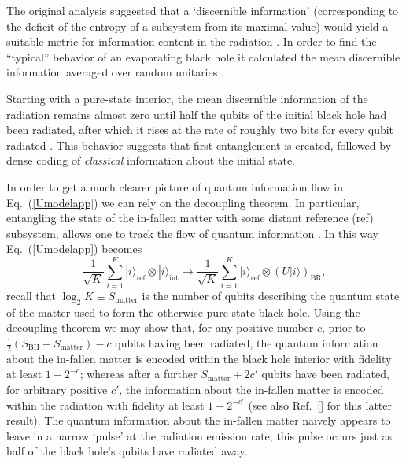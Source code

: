 \documentclass[twocolumn,aps,showpacs,prl]{revtex4}
\begin{document}
The original analysis suggested that a `discernible information'
(corresponding to the deficit of the entropy of a subsystem from
its maximal value) would yield a suitable metric for information
content in the radiation \cite{Page93app}. In order to find the
``typical'' behavior of an evaporating black hole it calculated
the mean discernible information averaged over random
unitaries \cite{Page93app}.

Starting with a pure-state interior, the mean discernible information
of the radiation remains almost zero until half the qubits of the
initial black hole had been radiated, after which it rises at
the rate of roughly two bits for every qubit radiated \cite{Page93app}.
This behavior suggests that first entanglement is created, followed by
dense coding \cite{Bennett92app} of {\it classical\/} information about the
initial state.

In order to get a much clearer picture of quantum information flow
in Eq.~(\ref{Umodelapp}) we can rely on the decoupling theorem.
In particular, entangling the state of the in-fallen matter with some
distant reference (ref) subsystem, allows one to track the flow of
quantum information \cite{meapp,Hayden07app}. In this way Eq.~(\ref{Umodelapp})
becomes
\begin{equation}
\frac{1}{\sqrt{K}}\sum_{i=1}^{K}
|i\rangle_{\text{ref}}\otimes|i\rangle_{\text{int}}\rightarrow
\frac{1}{\sqrt{K}}\sum_{i=1}^{K}
|i\rangle_{\text{ref}}\otimes(U|i\rangle)_{\text{BR}},
\label{HaydenPreskill}
\end{equation}
recall that $\log_2 K\equiv S_{\text{matter}}$ is the number of qubits
describing the quantum state of the matter used to form the otherwise
pure-state black hole. Using the decoupling theorem \cite{Abey06app}
we may show that, for any positive number $c$, prior to
$\frac{1}{2}(S_{\text{BH}}-S_{\text{matter}})-c$ qubits having been
radiated, the quantum information about the in-fallen matter
is encoded within the black hole interior with fidelity at least
$1-2^{-c}$; whereas after a further $S_{\text{matter}} + 2c'$ qubits
have been radiated, for arbitrary positive $c'$, the information
about the in-fallen matter is encoded within the radiation with
fidelity at least $1-2^{-c'}$ (see also Ref.~[]
for this latter result). The quantum information about the in-fallen
matter naively appears to leave in a narrow `pulse' at the radiation
emission rate; this pulse occurs just as half of the black hole's
qubits have radiated away.
\end{document}
